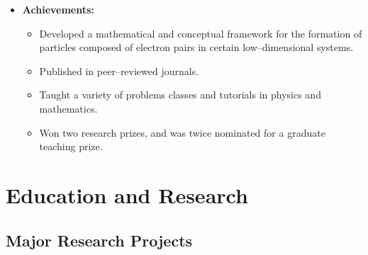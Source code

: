 \documentclass[11pt,a4paper,sans]{moderncv}        %
\begin{document}
\begin{itemize}
{{{\begin{itemize}
\item \textbf{Achievements: } 
\begin{itemize}
\item Developed a mathematical and conceptual framework for the formation of particles composed of electron pairs in certain low--dimensional systems.
\item Published in peer--reviewed journals.
\item Taught a variety of problems classes and tutorials in physics and mathematics.
\item Won two research prizes, and was twice nominated for a graduate teaching prize.
\end{itemize}
\end{itemize}
}}}

\end{itemize}

\section{Education and Research}

\vspace{5pt}

\begin{itemize}
\small{
\item{}

\item{}  %

\item{}  %
}
\end{itemize}

\vspace{5pt}

\subsection{Major Research Projects}

\vspace{5pt}
\end{document}
